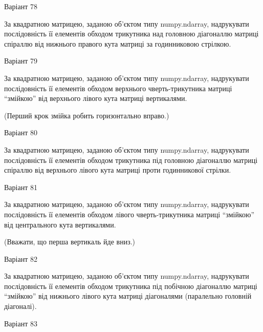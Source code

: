 \documentclass[11pt, ukrainian]{article}
\begin{document}
{\Large \center  Варіант  78\par \bigskip\bigskip}

За квадратною матрицею, заданою об'єктом типу numpy.ndarray, надрукувати послідовність її елементів обходом трикутника над головною діагоналлю матриці спіраллю від нижнього правого кута матриці за годинниковою стрілкою.





{\Large \center  Варіант  79\par \bigskip\bigskip}

За квадратною матрицею, заданою об'єктом типу numpy.ndarray, надрукувати послідовність її елементів обходом верхнього чверть-трикутника матриці ``змійкою'' від верхнього лівого кута матриці вертикалями.


(Перший крок змійка робить горизонтально вправо.)


{\Large \center  Варіант  80\par \bigskip\bigskip}

За квадратною матрицею, заданою об'єктом типу numpy.ndarray, надрукувати послідовність її елементів обходом трикутника під головною діагоналлю матриці спіраллю від верхнього лівого кута матриці проти годинникової стрілки.





{\Large \center  Варіант  81\par \bigskip\bigskip}

За квадратною матрицею, заданою об'єктом типу numpy.ndarray, надрукувати послідовність її елементів обходом лівого чверть-трикутника матриці ``змійкою'' від центрального кута вертикалями.


(Вважати, що перша вертикаль йде вниз.)


{\Large \center  Варіант  82\par \bigskip\bigskip}

За квадратною матрицею, заданою об'єктом типу numpy.ndarray, надрукувати послідовність її елементів обходом трикутника під побічною діагоналлю матриці ``змійкою'' від нижнього лівого кута матриці діагоналями (паралельно головній діагоналі).





{\Large \center  Варіант  83\par \bigskip\bigskip}
\end{document}

